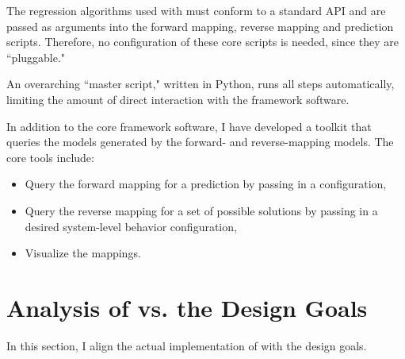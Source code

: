 The regression algorithms used with \fw must conform to a standard API
and are passed as arguments into the forward mapping, reverse mapping and prediction scripts.
Therefore, no configuration of these core scripts is needed, since they are ``pluggable."

An overarching ``master script," written in Python, runs all steps automatically, limiting the amount of direct interaction with the framework software.

In addition to the core framework software, I have developed a toolkit that queries the models generated by the forward- and reverse-mapping models.
The core tools include:
\begin{itemize}
   \item Query the forward mapping for a prediction by passing in a configuration,
   \item Query the reverse mapping for a set of possible solutions by passing in a desired system-level behavior configuration,
   \item Visualize the mappings.
\end{itemize}








\section{Analysis of \fw  vs. the Design Goals}
In this section, I align the actual implementation of \fw with the design goals.



